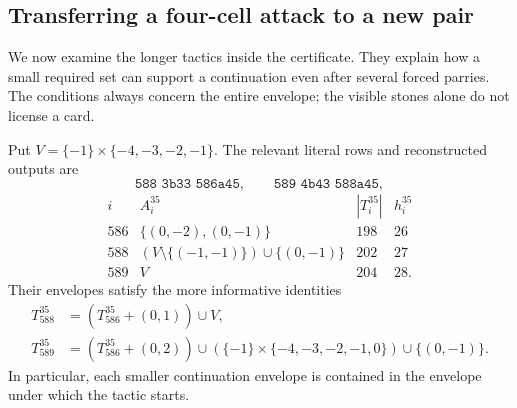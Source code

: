 \subsection{Transferring a four-cell attack to a new pair}
\label{r35:transfer}

We now examine the longer tactics inside the certificate.  They explain
how a small required set can support a continuation even after several
forced parries.  The conditions always concern the entire envelope;
the visible stones alone do not license a card.

Put \(V=\{-1\}\times\{-4,-3,-2,-1\}\).  The relevant literal rows and
reconstructed outputs are
\[
 \texttt{588 3b33 586a45},\qquad
 \texttt{589 4b43 588a45},
\]
\begin{equation}\label{r35:transfer-data}
\begin{array}{c|c|r|r}
i&A_i^{35}&|T_i^{35}|&h_i^{35}\\ \hline
586&\{(0,-2),(0,-1)\}&198&26\\
588&(V\setminus\{(-1,-1)\})\cup\{(0,-1)\}&202&27\\
589&V&204&28.
\end{array}
\end{equation}
Their envelopes satisfy the more informative identities
\begin{equation}\label{r35:transfer-envelopes}
\begin{split}
T_{588}^{35}&=(T_{586}^{35}+(0,1))\cup V,\\
T_{589}^{35}&=(T_{586}^{35}+(0,2))
 \cup (\{-1\}\times\{-4,-3,-2,-1,0\})\cup\{(0,-1)\}.
\end{split}
\end{equation}
In particular, each smaller continuation envelope is contained in the
envelope under which the tactic starts.

